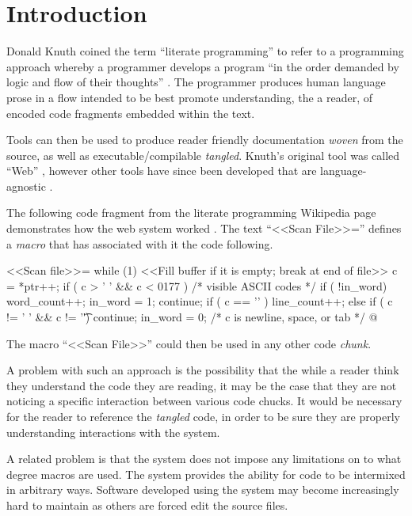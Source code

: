 \documentclass[]{article}
\begin{document}
\section{	Introduction}

Donald Knuth coined the term ``literate programming'' to refer to a programming approach whereby a programmer develops a program ``in the order demanded by logic and flow of their thoughts'' \cite{Wikipedia}.
The programmer produces human language prose in a flow intended to be best promote understanding, the a reader, of encoded code fragments embedded within the text.


Tools can then be used to produce reader friendly documentation \emph{woven} from the source, as well as executable/compilable \emph{tangled}.
Knuth's original tool was called ``Web'' \cite{Web}, however other tools have since been developed that are language-agnostic \cite{XXX}.


The following code fragment from the literate programming Wikipedia page demonstrates how the web system worked \cite{Wikipedia}.
The text ``\textless{}\textless{}Scan File\textgreater{}\textgreater{}='' defines a \emph{macro} that has associated with it the code following.

\begin{verbatimtab}
	<<Scan file>>=
	while (1) {
		<<Fill buffer if it is empty; break at end of file>>
		c = *ptr++;
		if ( c > ' ' && c < 0177 ) {
			/* visible ASCII codes */
			if ( !in_word) {
				word_count++;
				in_word = 1;
			}
			continue;
		}
		if ( c == '\n' ) line_count++;
		else if ( c != ' ' && c != '\t') continue;
		in_word = 0;
			/* c is newline, space, or tab */
	}
	@

\end{verbatimtab}

The macro ``\textless{}\textless{}Scan File\textgreater{}\textgreater{}'' could then be used in any other code \emph{chunk}.


A problem with such an approach is the possibility that the while a reader think they understand the code they are reading, it may be the case that they are not noticing a specific interaction between various code chucks.
It would be necessary for the reader to reference the \emph{tangled} code, in order to be sure they are properly understanding interactions with the system.


A related problem is that the system does not impose any limitations on to what degree macros are used.
The system provides the ability for code to be intermixed in arbitrary ways.
Software developed using the system may become increasingly hard to maintain as others are forced edit the source files.
\end{document}
